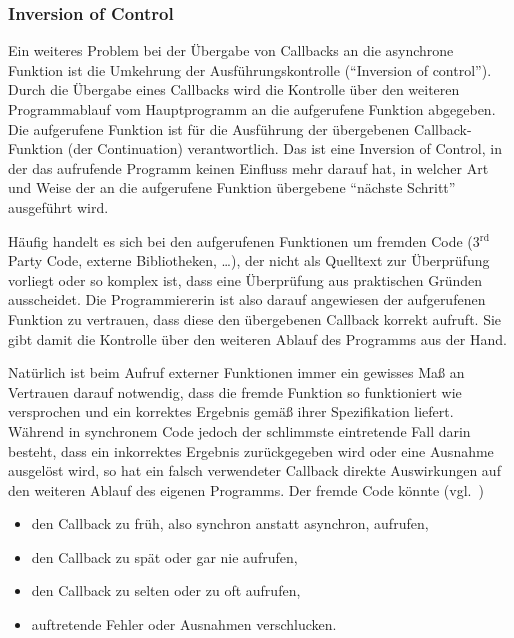 \documentclass[
11pt, %
a4paper, %
oneside, %
pdfspacing, %
headinclude,
BCOR5mm, %
ngerman, %
bibtotocnumbered,
]{scrartcl}
\begin{document}
	\subsubsection{Inversion of Control}
	Ein weiteres Problem bei der Übergabe von Callbacks an die asynchrone Funktion ist die Umkehrung der Ausführungskontrolle ("`Inversion of control"'). Durch die Übergabe eines Callbacks wird die Kontrolle über den weiteren Programmablauf vom Hauptprogramm an die aufgerufene Funktion abgegeben. Die aufgerufene Funktion ist für die Ausführung der übergebenen Callback-Funktion (der Continuation) verantwortlich. Das ist eine Inversion of Control, in der das aufrufende Programm keinen Einfluss mehr darauf hat, in welcher Art und Weise der an die aufgerufene Funktion übergebene "`nächste Schritt"' ausgeführt wird.
	
	Häufig handelt es sich bei den aufgerufenen Funktionen um fremden Code (3$^\mathrm{rd}$ Party Code, externe Bibliotheken, \ldots), der nicht als Quelltext zur Überprüfung vorliegt oder so komplex ist, dass eine Überprüfung aus praktischen Gründen ausscheidet.
	Die Programmiererin ist also darauf angewiesen der aufgerufenen Funktion zu vertrauen, dass diese den übergebenen Callback korrekt aufruft. Sie gibt damit die Kontrolle über den weiteren Ablauf des Programms aus der Hand.
	
	Natürlich ist beim Aufruf externer Funktionen immer ein gewisses Maß an Vertrauen darauf notwendig, dass die fremde Funktion so funktioniert wie versprochen und ein korrektes Ergebnis gemäß ihrer Spezifikation liefert. Während in synchronem Code jedoch der schlimmste eintretende Fall darin besteht, dass ein inkorrektes Ergebnis zurückgegeben wird oder eine Ausnahme ausgelöst wird, so hat ein falsch verwendeter Callback direkte Auswirkungen auf den weiteren Ablauf des eigenen Programms. Der fremde Code könnte (vgl.~\citep[S.~48]{Simpson.2015})
	\begin{itemize}[nosep]
		\item den Callback zu früh, also synchron anstatt asynchron, aufrufen,
		\item den Callback zu spät oder gar nie aufrufen,
		\item den Callback zu selten oder zu oft aufrufen,
		\item auftretende Fehler oder Ausnahmen verschlucken.
	\end{itemize}
\end{document}
